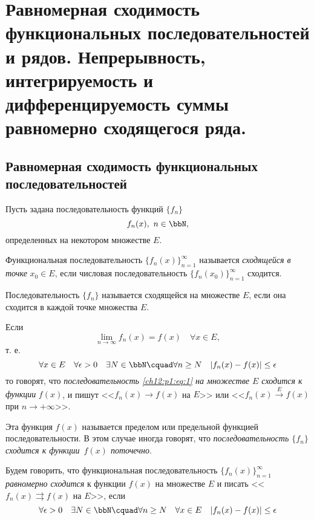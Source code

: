 \chapter{Равномерная сходимость функциональных последовательностей и рядов. Непрерывность, интегрируемость и дифференцируемость суммы равномерно сходящегося ряда.}

\section{Равномерная сходимость функциональных последовательностей}

Пусть задана последовательность функций $\{f_n\}$
\begin{equation}
	\label{ch12:p1:eq:1}
	f_n(x),\ n\in \bbN,
\end{equation}
определенных на некотором множестве $E$.

\begin{defn}
	Функциональная последовательность $\{f_n(x)\}_{n=1}^\infty$ называется \textit{сходящейся в точке} $x_0 \in E$,
	если числовая последовательность $\{f_n(x_0)\}_{n=1}^\infty$ сходится.

	Последовательность $\{f_n\}$ называется сходящейся на множестве $E$, если она сходится в каждой точке множества $E$.

	Если
	$$
		\lim_{n \to \infty} f_n(x) = f(x)\quad \forall x\in E,
	$$
	т. е.
	\begin{equation}
		\label{ch12:p1:eq:2}
		\forall x \in E \quad \forall \epsilon > 0 \quad \exists N \in \bbN \cquad
			\forall n \ge N \quad |f_n(x) - f(x)| \le \epsilon
	\end{equation}
	то говорят, что \textit{последовательность \eqref{ch12:p1:eq:1} на множестве $E$ сходится к функции} $f(x)$,
	и пишут <<$f_n(x) \to f(x)$ на $E$>> или <<$f_n(x) \xrightarrow{E} f(x)$ при $n \to +\infty$>>.

	Эта функция $f(x)$ называется пределом или предельной функцией последовательности.
	В этом случае иногда говорят, что \textit{последовательность $\{f_n\}$ сходится к функции~$f(x)$ поточечно}.
\end{defn}

\begin{defn}
	Будем говорить, что функциональная последовательность $\{f_n(x)\}_{n=1}^\infty$ \textit{равномерно сходится} к функции $f(x)$
	на множестве $E$ и писать <<$f_n(x) \rightrightarrows f(x)$ на $E$>>, если
	\begin{equation}
		\label{ch12:p1:eq:3}
		\forall \epsilon > 0 \quad \exists N \in \bbN \cquad
			\forall n \ge N \quad \forall x \in E \quad |f_n(x) - f(x)| \le \epsilon
	\end{equation}
\end{defn}

